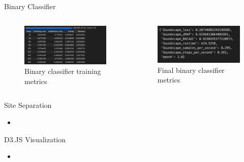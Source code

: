\begin{frame}{Binary Classifier}
    \begin{columns}
        \begin{column}{0.5\textwidth}
            \begin{figure}
                \centering
                \includegraphics[height=1.0\textheight,width=1.0\textwidth,keepaspectratio]{images/binary_classifier_metrics_1.png}
                \caption{Binary classifier training metrics}
            \end{figure}
        \end{column}
        \begin{column}{0.5\textwidth}
            \begin{figure}
                \centering
                \includegraphics[height=1.0\textheight,width=1.0\textwidth,keepaspectratio]{images/binary_classifier_metrics_2.png}
                \caption{Final binary classifier metrics}
            \end{figure}
        \end{column}
    \end{columns}
\end{frame}

\begin{frame}{Site Separation}
    \begin{itemize}
        \item 
    \end{itemize}
\end{frame}

\begin{frame}{D3.JS Visualization}
    \begin{itemize}
        \item 
    \end{itemize}
\end{frame}